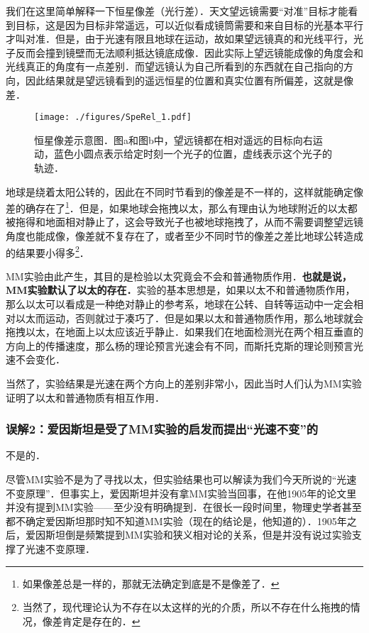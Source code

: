 我们在这里简单解释一下恒星像差（光行差）．天文望远镜需要“对准”目标才能看到目标，这是因为目标非常遥远，可以近似看成镜筒需要和来自目标的光基本平行才叫对准．但是，由于光速有限且地球在运动，故如果望远镜真的和光线平行，光子反而会撞到镜壁而无法顺利抵达镜底成像．因此实际上望远镜能成像的角度会和光线真正的角度有一点差别．而望远镜认为自己所看到的东西就在自己指向的方向，因此结果就是望远镜看到的遥远恒星的位置和真实位置有所偏差，这就是像差．

\begin{figure}[ht]
\centering
\texttt{[image: ./figures/SpeRel\_1.pdf]}
\caption{恒星像差示意图．图a和图b中，望远镜都在相对遥远的目标向右运动，蓝色小圆点表示给定时刻一个光子的位置，虚线表示这个光子的轨迹．} \label{SpeRel_fig1}
\end{figure}

地球是绕着太阳公转的，因此在不同时节看到的像差是不一样的，这样就能确定像差的确存在了\footnote{如果像差总是一样的，那就无法确定到底是不是像差了．}．但是，如果地球会拖拽以太，那么有理由认为地球附近的以太都被拖得和地面相对静止了，这会导致光子也被地球拖拽了，从而不需要调整望远镜角度也能成像，像差就不复存在了，或者至少不同时节的像差之差比地球公转造成的结果要小得多\footnote{当然了，现代理论认为不存在以太这样的光的介质，所以不存在什么拖拽的情况，像差肯定是存在的．}．



MM实验由此产生，其目的是检验以太究竟会不会和普通物质作用．\textbf{也就是说，MM实验默认了以太的存在．}实验的基本思想是，如果以太不和普通物质作用，那么以太可以看成是一种绝对静止的参考系，地球在公转、自转等运动中一定会相对以太而运动，否则就过于凑巧了．但是如果以太和普通物质作用，那么地球就会拖拽以太，在地面上以太应该近乎静止．如果我们在地面检测光在两个相互垂直的方向上的传播速度，那么杨的理论预言光速会有不同，而斯托克斯的理论则预言光速不会变化．

当然了，实验结果是光速在两个方向上的差别非常小，因此当时人们认为MM实验证明了以太和普通物质有相互作用．

\subsubsection{误解2：爱因斯坦是受了MM实验的启发而提出“光速不变”的}

不是的．

尽管MM实验不是为了寻找以太，但实验结果也可以解读为我们今天所说的“光速不变原理”．但事实上，爱因斯坦并没有拿MM实验当回事，在他1905年的论文里并没有提到MM实验——至少没有明确提到．在很长一段时间里，物理史学者甚至都不确定爱因斯坦那时知不知道MM实验（现在的结论是，他知道的）．1905年之后，爱因斯坦倒是频繁提到MM实验和狭义相对论的关系，但是并没有说过实验支撑了光速不变原理．

